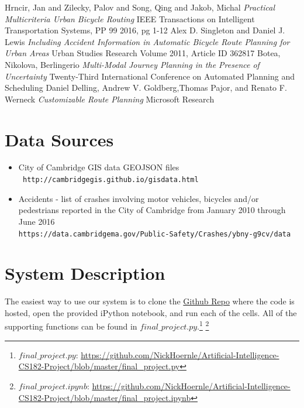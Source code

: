 \documentclass[11pt]{article}
\begin{document}
\begin{thebibliography}{9}
Hrncir, Jan and Zilecky, Palov and Song, Qing and Jakob, Michal
\textit{Practical Multicriteria Urban Bicycle Routing}
IEEE Transactions on Intelligent Transportation Systems, PP 99 2016, pg 1-12
Alex D. Singleton and Daniel J. Lewis
\textit{Including Accident Information in Automatic Bicycle Route Planning for Urban Areas}
Urban Studies Research Volume 2011, Article ID 362817
Botea, Nikolova, Berlingerio
\textit{Multi-Modal Journey Planning in the Presence of Uncertainty}
Twenty-Third International Conference on Automated Planning and Scheduling
Daniel Delling, Andrew V. Goldberg,Thomas Pajor, and Renato F. Werneck
\textit{Customizable Route Planning}
Microsoft Research
\end{thebibliography}

\section*{Data Sources}
\begin{itemize}
\item City of Cambridge GIS data GEOJSON files \\
\texttt{ http://cambridgegis.github.io/gisdata.html}
\item Accidents - list of crashes involving motor vehicles, bicycles and/or pedestrians reported in the City of Cambridge from January 2010 through June 2016 \\
\texttt {https://data.cambridgema.gov/Public-Safety/Crashes/ybny-g9cv/data} \\
\end{itemize}


\newpage
\appendix
\section{System Description}

The easiest way to use our system is to clone the \href{https://github.com/NickHoernle/Artificial-Intelligence-CS182-Project/blob/master/}{Github Repo} where the code is hosted, open the provided iPython notebook, and run each of the cells. All of the supporting functions can be found in $final\_project.py$.\footnote{$final\_project.py$: \url{https://github.com/NickHoernle/Artificial-Intelligence-CS182-Project/blob/master/final_project.py}} \footnote{$final\_project.ipynb$: \url{https://github.com/NickHoernle/Artificial-Intelligence-CS182-Project/blob/master/final_project.ipynb}}
\end{document}
